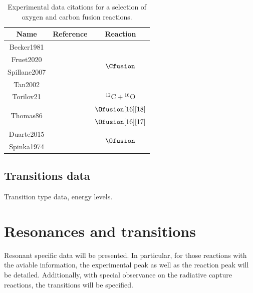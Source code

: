 \documentclass[openany]{book}
\begin{document}
 
\begin{table}[H]
	\centering
	\begin{tabular}{|c|c|c|}
		\hline
		Name & Reference & Reaction \\ \hline
		Becker1981 &   \cite{becker_kettner_rolfs_trautvetter_1981}  &    \multirow{4}{*}{$\Cfusion$} \\ \cline{1-2}
		Fruet2020 &  \cite{fruet_courtin_heine_jenkins_adsley_brown_canavan_catford_charon_curien_et_2020}          & \\ \cline{1-2}
		Spillane2007 &   \cite{spillane_raiola_rolfs_schurmann_strieder_zeng_becker_bordeanu_gialanella_romano_et_2007}  &   \\ \cline{1-2}
		Tan2002 &    \cite{tan_boeltzig_dulal_deboer_frentz_henderson_howard_kelmar_kolata_long_et_2020}  & \\ \hline
		Torilov21  &  \cite{torilov_maltsev_zherebchevsky_2021}     & $\mathrm{{}^{12}C + {}^{16}O}$       \\ \hline
		\multirow{2}{*}{Thomas86} & \multirow{2}{*}{  \cite{thomas_chen_hinds_meredith_olson_1986} }  &     $\Ofusion[16][18]$  \\ \cline{3-3} 
	 	 &  &     $\Ofusion[16][17]$ \\ \hline
		Duarte2015  &   \cite{duarte_gasques_oliveira_zagatto_chamon_medina_added_seale_alcantara-nunez_rossi_et_2015} & \multirow{2}{*}{ $\Ofusion$}  \\ \cline{1-2} 
		Spinka1974   &  \cite{spinka_winkler_1974}  &  \\ \hline
	\end{tabular}
	\caption[References oxygen and carbon fusion experimental data]{Experimental data citations for a selection of oxygen and carbon fusion reactions.}
\label{table:fusion}
\end{table}


\subsection{Transitions data} \label{sub:TransitionsData}

Transition type data, energy levels. 

\section{Resonances and transitions} \label{sec:resonancesTransitions}

Resonant specific data will be presented. In particular, for those reactions with the aviable information, the experimental peak as well as the reaction peak will be detailed. Additionally, with special observance on the radiative capture reactions, the transitions will be specified.
\end{document}

